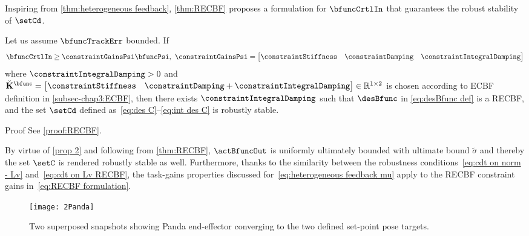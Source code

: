 Inspiring from \cref{thm:heterogeneous feedback}, \cref{thm:RECBF} proposes a formulation for $\bfuncCrtlIn$ that guarantees the robust stability of $\setCd$. 
\begin{theorem}\label{thm:RECBF} Let us assume $\bfuncTrackErr $ bounded. If
	\begin{equation}\label{eq:RECBF formulation}
		\bfuncCrtlIn\geq\constraintGainsPsi\bfuncPsi, \ \constraintGainsPsi=\begin{bmatrix}
			\constraintStiffness & \constraintDamping & \constraintIntegralDamping
		\end{bmatrix}
	\end{equation}
	where $\constraintIntegralDamping>0$ and  $\check{\mathbf{K}}^{\bfunc} = \begin{bmatrix}
		\constraintStiffness & \constraintDamping + \constraintIntegralDamping
	\end{bmatrix}\in\mathbb{R}^{1\times2}$ is chosen according to  ECBF definition in \cref{subsec-chap3:ECBF}, then there exists $\constraintIntegralDamping$ such that $\desBfunc$ in \cref{eq:desBfunc def} is a RECBF, and the set $\setCd$ defined as~\cref{eq:des C}--\cref{eq:int des C} is robustly stable. %
\end{theorem}
\begin{custumProof}{Proof}
	See \cref{proof:RECBF}.
\end{custumProof}
By virtue of \cref{prop 2} and following from \cref{thm:RECBF}, $\actBfuncOut$ is uniformly ultimately bounded with ultimate bound $\tilde{\sigma}$ and thereby the set $\setC$ is rendered robustly stable as well.   
Furthermore, thanks to the similarity between the robustness conditions~\cref{eq:cdt on norm - Lv} and~\cref{eq:cdt on Lv RECBF}, the task-gains properties discussed for~\cref{eq:heterogeneous feedback mu} apply to the RECBF constraint gains in~\cref{eq:RECBF formulation}.
\begin{figure}
	\centering
	\texttt{[image: 2Panda]}
	\caption{Two superposed snapshots showing Panda end-effector converging to the two defined set-point pose targets.}
	\label{fig:panda_snap}
\end{figure}


